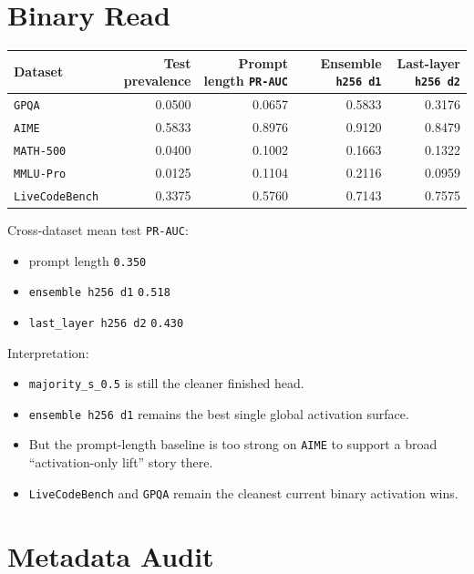 \documentclass[11pt]{article}
\begin{document}
\section*{Binary Read}
\begin{center}
\small
\begin{tabular}{@{}lrrrr@{}}
\toprule
Dataset & Test prevalence & Prompt length \texttt{PR-AUC} & Ensemble \texttt{h256 d1} & Last-layer \texttt{h256 d2} \\
\midrule
\texttt{GPQA} & 0.0500 & 0.0657 & 0.5833 & 0.3176 \\
\texttt{AIME} & 0.5833 & 0.8976 & 0.9120 & 0.8479 \\
\texttt{MATH-500} & 0.0400 & 0.1002 & 0.1663 & 0.1322 \\
\texttt{MMLU-Pro} & 0.0125 & 0.1104 & 0.2116 & 0.0959 \\
\texttt{LiveCodeBench} & 0.3375 & 0.5760 & 0.7143 & 0.7575 \\
\bottomrule
\end{tabular}
\end{center}

Cross-dataset mean test \texttt{PR-AUC}:
\begin{itemize}[leftmargin=1.5em]
\item prompt length \texttt{0.350}
\item \texttt{ensemble h256 d1} \texttt{0.518}
\item \texttt{last\_layer h256 d2} \texttt{0.430}
\end{itemize}

Interpretation:
\begin{itemize}[leftmargin=1.5em]
\item \texttt{majority\_s\_0.5} is still the cleaner finished head.
\item \texttt{ensemble h256 d1} remains the best single global activation surface.
\item But the prompt-length baseline is too strong on \texttt{AIME} to support a broad ``activation-only lift'' story there.
\item \texttt{LiveCodeBench} and \texttt{GPQA} remain the cleanest current binary activation wins.
\end{itemize}

\section*{Metadata Audit}
\end{document}
